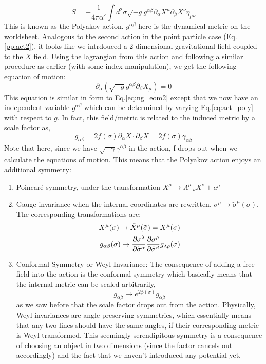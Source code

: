 \documentclass{article}
\begin{document}
\begin{equation}
	S = -\frac{1}{4\pi\alpha'} \int d^2\sigma \sqrt{-g}g^{\alpha\beta}\partial_\alpha X^\mu \partial_\beta X^\nu \eta_{\mu\nu} \label{eq:act_poly}
\end{equation}
This is known as the Polyakov action. $g^{\alpha\beta}$ here is the dynamical metric on the worldsheet. Analogous to the second action in the point particle case (Eq.\eqref{pp:act2}), it looks like we intrdouced a 2 dimensional gravitational field coupled to the $X$ field. Using the lagrangian from this action and following a similar procedure as earlier (with some index manipulation), we get the following equation of motion:
\begin{equation}
	\partial_\alpha(\sqrt{-g}g^{\alpha\beta}\partial_\beta X_\mu)=0 \label{eq:poly_eom}
\end{equation}
This equation is similar in form to Eq.\eqref{eq:ng_eom2} except that we now have an independent variable $g^{\alpha\beta}$ which can be determined by varying Eq.\eqref{eq:act_poly} with respect to $g$. In fact, this field/metric is related to the induced metric by a scale factor as,
\begin{equation}
	g_{\alpha\beta}=2f(\sigma)\partial_\alpha X\cdot\partial_\beta X  = 2f(\sigma)\gamma_{\alpha\beta}
\end{equation}
Note that here, since we have $\sqrt{-\gamma}\gamma^{\alpha\beta}$ in the action, f drops out when we calculate the equations of motion. This means that the Polyakov action enjoys an additional symmetry:
\begin{enumerate}
	\item Poincar\'e symmetry, under the transformation $X^\mu \rightarrow \Lambda^\mu\,_\nu X^\nu + a^\mu$
	\item Gauge invariance when the internal coordinates are rewritten, $\sigma^\mu \rightarrow \tilde{\sigma}^\mu(\sigma)$. The corresponding transformations are:
		\begin{align}
			X^\mu(\sigma) \rightarrow \tilde{X}^\mu(\tilde{\sigma}) = X^\mu(\sigma)\\
			g_{\alpha\beta}(\sigma) \rightarrow \pdv{\sigma^\lambda}{\tilde{\sigma}^\alpha}\pdv{\sigma^\rho}{\tilde{\sigma}^\beta}g_{\lambda\rho}(\sigma)
		\end{align}
	\item Conformal Symmetry or Weyl Invariance: The consequence of adding a free field into the action is the conformal symmetry which basically means that the internal metric can be scaled arbitrarily,
		\begin{equation}
			g_{\alpha\beta} \rightarrow e^{2\phi(\sigma)}g_{\alpha\beta}
		\end{equation}
	as we saw before that the scale factor drops out from the action. Physically, Weyl invariances are angle preserving symmetries, which essentially means that any two lines should have the same angles, if their corresponding metric is Weyl transformed. This seemingly serendipitous symmetry is a consequence of choosing an object in two dimensions (since the factor cancels out accordingly) and the fact that we haven't introduced any potential yet.
\end{enumerate}
\end{document}
